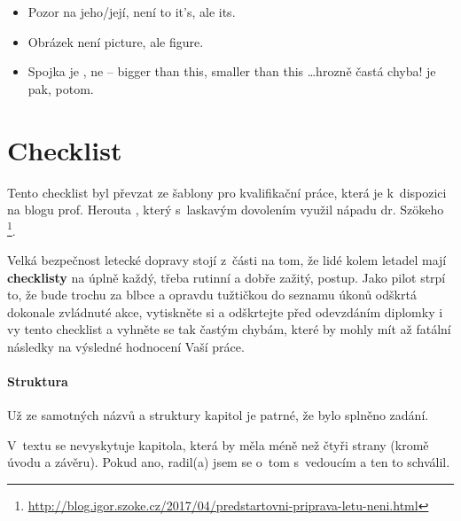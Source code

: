 \begin{itemize}
  \item{Pozor na jeho/její, není to it's, ale its.}
  \item{Obrázek není picture, ale figure. }
  \item{Spojka  je , ne  -- bigger than this, smaller than this \ldots hrozně častá chyba!  je pak, potom.}
\end{itemize}


\chapter{Checklist} 
\label{checklist}
Tento checklist byl převzat ze šablony pro kvalifikační práce, která je k~dispozici na blogu prof. Herouta \cite{Herout}, který s~laskavým dovolením využil nápadu dr. Szökeho%
\footnote{\url{http://blog.igor.szoke.cz/2017/04/predstartovni-priprava-letu-neni.html}}. 

Velká bezpečnost letecké dopravy stojí z~části na tom, že lidé kolem letadel mají \textbf{checklisty} na úplně každý, třeba rutinní a dobře zažitý, postup. Jako pilot strpí to, že bude trochu za blbce a opravdu tužtičkou do seznamu úkonů odškrtá dokonale zvládnuté akce, vytiskněte si a odškrtejte před odevzdáním diplomky i vy tento checklist a vyhněte se tak častým chybám, které by mohly mít až fatální následky na výsledné hodnocení Vaší práce.

\subsubsection*{Struktura}
\begin{checklist}
	\item Už ze samotných názvů a struktury kapitol je patrné, že bylo splněno zadání.
	\item V~textu se nevyskytuje kapitola, která by měla méně než čtyři strany (kromě úvodu a závěru). Pokud ano, radil(a) jsem se o~tom s~vedoucím a ten to schválil.
\end{checklist}

